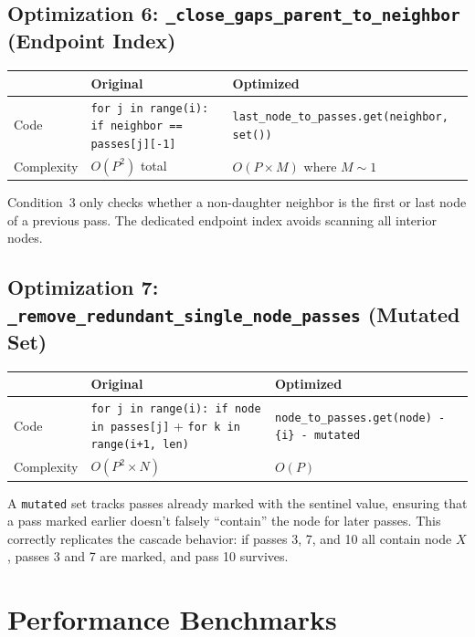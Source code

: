\documentclass[11pt,a4paper]{article}
\begin{document}
\subsection{Optimization 6: \texttt{\_close\_gaps\_parent\_to\_neighbor} (Endpoint Index)}

\begin{table}[H]
\centering
\begin{tabularx}{\textwidth}{lXX}
\toprule
& \textbf{Original} & \textbf{Optimized} \\
\midrule
Code & \texttt{for j in range(i): if neighbor == passes[j][-1]} & \texttt{last\_node\_to\_passes.get(neighbor, set())} \\
Complexity & $O(P^2)$ total & $O(P \times M)$ where $M \sim 1$ \\
\bottomrule
\end{tabularx}
\end{table}

Condition~3 only checks whether a non-daughter neighbor is the first or last node of a previous pass. The dedicated endpoint index avoids scanning all interior nodes.

\subsection{Optimization 7: \texttt{\_remove\_redundant\_single\_node\_passes} (Mutated Set)}

\begin{table}[H]
\centering
\begin{tabularx}{\textwidth}{lXX}
\toprule
& \textbf{Original} & \textbf{Optimized} \\
\midrule
Code & \texttt{for j in range(i): if node in passes[j]} + \texttt{for k in range(i+1, len)} & \texttt{node\_to\_passes.get(node) - \{i\} - mutated} \\
Complexity & $O(P^2 \times N)$ & $O(P)$ \\
\bottomrule
\end{tabularx}
\end{table}

A \texttt{mutated} set tracks passes already marked with the sentinel value, ensuring that a pass marked earlier doesn't falsely ``contain'' the node for later passes. This correctly replicates the cascade behavior: if passes 3, 7, and 10 all contain node $X$, passes 3 and 7 are marked, and pass 10 survives.


\section{Performance Benchmarks}
\end{document}
